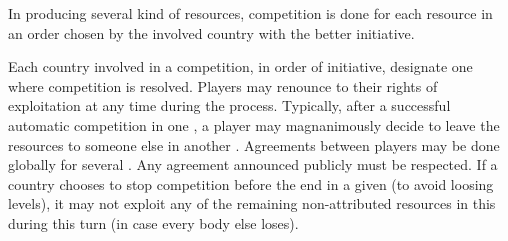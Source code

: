  In \Area producing several kind of
resources, competition is done for each resource in an order chosen by the
involved country with the better initiative.

 Each country involved in a competition, in
order of initiative, designate one \Area where competition is resolved.
\bparag Players may renounce to their rights of exploitation at any time
during the process. Typically, after a successful automatic competition in one
\Area, a player may magnanimously decide to leave the resources to someone
else in another \Area.
\bparag Agreements between players may be done globally for several \Area. Any
agreement announced publicly must be respected.
\bparag If a country chooses to stop competition before the end in a given
\Area (to avoid loosing levels), it may not exploit any of the remaining
non-attributed resources in this \Area during this turn (in case every body
else loses).


